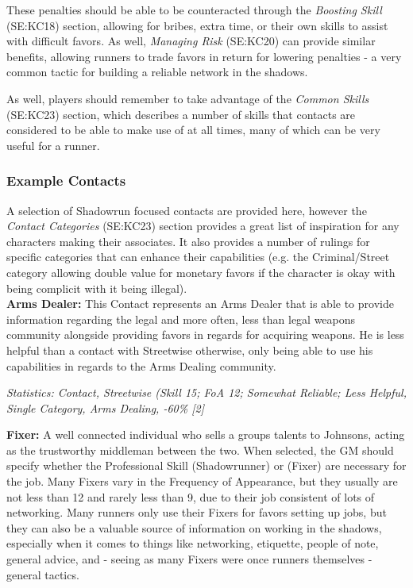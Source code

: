 \begin{multicols*}{2}
	These penalties should be able to be counteracted through the \textit{Boosting Skill} (SE:KC18) section, allowing for bribes, extra time, or their own skills to assist with difficult favors. As well, \textit{Managing Risk} (SE:KC20) can provide similar benefits, allowing runners to trade favors in return for lowering penalties - a very common tactic for building a reliable network in the shadows.
	
	As well, players should remember to take advantage of the \textit{Common Skills} (SE:KC23) section, which describes a number of skills that contacts are considered to be able to make use of at all times, many of which can be very useful for a runner.
	
	\subsubsection{Example Contacts}
	
	A selection of Shadowrun focused contacts are provided here, however the \textit{Contact Categories} (SE:KC23) section provides a great list of inspiration for any characters making their associates. It also provides a number of rulings for specific categories that can enhance their capabilities (e.g. the Criminal/Street category allowing double value for monetary favors if the character is okay with being complicit with it being illegal).\\
	
	\textbf{Arms Dealer:} This Contact represents an Arms Dealer that is able to provide information regarding the legal and more often, less than legal weapons community alongside providing favors in regards for acquiring weapons. He is less helpful than a contact with Streetwise otherwise, only being able to use his capabilities in regards to the Arms Dealing community.
	
	\textit{\textcolor{OliveGreen}{Statistics: Contact, Streetwise (Skill 15; FoA 12; Somewhat Reliable; Less Helpful, Single Category, Arms Dealing, -60\% [2]}}
	
	\textbf{Fixer:} A well connected individual who sells a groups talents to Johnsons, acting as the trustworthy middleman between the two. When selected, the GM should specify whether the Professional Skill (Shadowrunner) or (Fixer) are necessary for the job. Many Fixers vary in the Frequency of Appearance, but they usually are not less than 12 and rarely less than 9, due to their job consistent of lots of networking. Many runners only use their Fixers for favors setting up jobs, but they can also be a valuable source of information on working in the shadows, especially when it comes to things like networking, etiquette, people of note, general advice, and - seeing as many Fixers were once runners themselves - general tactics.
	

\end{multicols*}
